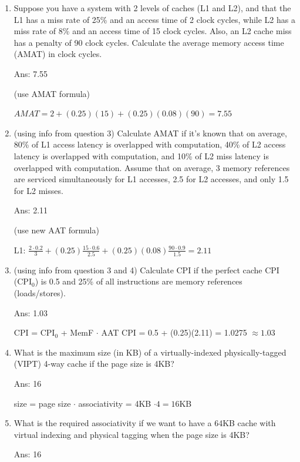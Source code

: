 \documentclass[12pt]{article}
\begin{document}
\begin{enumerate}
        \item Suppose you have a system with 2 levels of caches (L1 and L2), and that the L1 has a miss rate of 25\% and 
        an access time of 2 clock cycles, while L2 has a miss rate of 8\% and an access time of 15 clock cycles. Also, 
        an L2 cache miss has a penalty of 90 clock cycles. Calculate the average memory access time (AMAT) in clock cycles.

        Ans: 7.55

        (use AMAT formula)

        $AMAT = 2 + (0.25)(15) + (0.25)(0.08)(90) = 7.55$

        \item (using info from question 3) Calculate AMAT if it's known that on average, 80\% of L1 access latency is 
        overlapped with computation, 40\% of L2 access latency is overlapped with computation, and 10\% of L2 miss latency 
        is overlapped with computation. Assume that on average, 3 memory references are serviced simultaneously for L1 
        accesses, 2.5 for L2 accesses, and only 1.5 for L2 misses.

        Ans: 2.11

        (use new AAT formula)

        L1: $\frac{2 \cdot 0.2}{3} + (0.25)\frac{15 \cdot 0.6}{2.5} + (0.25)(0.08)\frac{90 \cdot 0.9}{1.5} = 2.11$

        \item (using info from question 3 and 4) Calculate CPI if the perfect cache CPI (CPI$_0$) is 0.5 and 25\% of all 
        instructions are memory references (loads/stores).

        Ans: 1.03

        CPI = CPI$_0$ + MemF $\cdot$ AAT
        CPI = 0.5 + (0.25)(2.11) = 1.0275 $\approx 1.03$

        \item What is the maximum size (in KB) of a virtually-indexed physically-tagged (VIPT) 4-way cache if the page 
        size is 4KB?

        Ans: 16

        size = page size $\cdot$ associativity = 4KB $\cdot 4 = 16$KB

        \item What is the required associativity if we want to have a 64KB cache with virtual indexing and physical 
        tagging when the page size is 4KB?

        Ans: 16


\end{enumerate}
\end{document}
